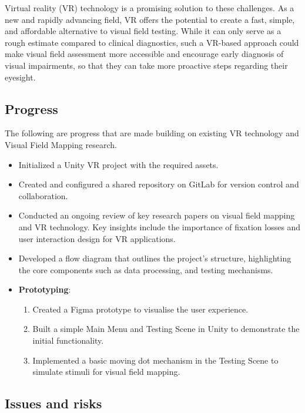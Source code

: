 \documentclass[11pt]{article}
\begin{document}
Virtual reality (VR) technology is a promising solution to these challenges. As a new and rapidly advancing field, VR offers the potential to create a fast, simple, and affordable alternative to visual field testing. While it can only serve as a rough estimate compared to clinical diagnostics, such a VR-based approach could make visual field assessment more accessible and encourage early diagnosis of visual impairments, so that they can take more proactive steps regarding their eyesight.


\subsection{Progress}\label{progress}
The following are progress that are made building on existing VR technology and Visual Field Mapping research.

\begin{itemize}
    \item Initialized a Unity VR project with the required assets.
    \item Created and configured a shared repository on GitLab for version control and collaboration.
    \item Conducted an ongoing review of key research papers on visual field mapping and VR technology. Key insights include the importance of fixation losses and user interaction design for VR applications.
    \item Developed a flow diagram that outlines the project's structure, highlighting the core components such as data processing, and testing mechanisms.
    \item \textbf{Prototyping}:
    \begin{enumerate}
        \item Created a Figma prototype to visualise the user experience.
        \item Built a simple Main Menu and Testing Scene in Unity to demonstrate the initial functionality.
        \item Implemented a basic moving dot mechanism in the Testing Scene to simulate stimuli for visual field mapping.
    \end{enumerate}
\end{itemize}

\subsection{Issues and risks}\label{issues-and-risks}
\end{document}
